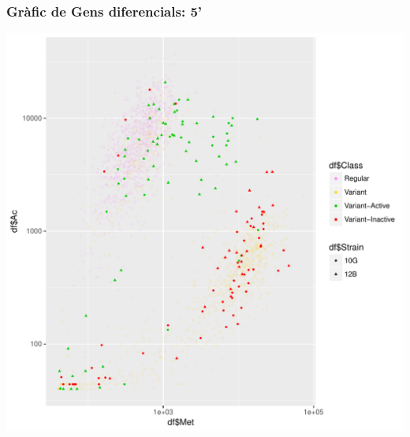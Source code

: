 \documentclass{article}\usepackage[]{graphicx}\usepackage[]{color}
\newenvironment{knitrout}{}{} %
\begin{document}
\subsubsection{Gràfic de Gens diferencials: 5'}
\begin{knitrout}
\color{fgcolor}

{\centering \includegraphics[width=1\linewidth]{figure/minimal-ac_met_log_status_10G_12B_5-1} 

}



\end{knitrout}
\clearpage
\end{document}
